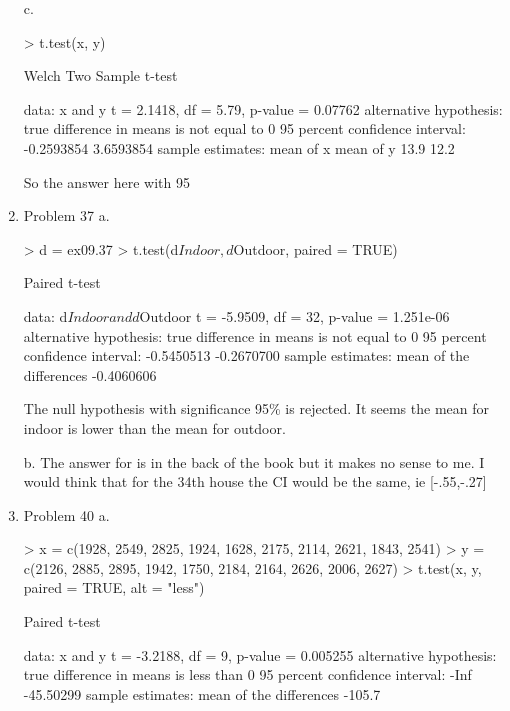 \documentclass[11pt,letterpaper]{article}
\begin{document}
\begin{enumerate}
c.
\begin{Schunk}
\begin{Sinput}
> t.test(x, y)
\end{Sinput}
\begin{Soutput}
	Welch Two Sample t-test

data:  x and y 
t = 2.1418, df = 5.79, p-value = 0.07762
alternative hypothesis: true difference in means is not equal to 0 
95 percent confidence interval:
 -0.2593854  3.6593854 
sample estimates:
mean of x mean of y 
     13.9      12.2 
\end{Soutput}
\end{Schunk}
So the answer here with 95 %

\item Problem 37
a.
\begin{Schunk}
\begin{Sinput}
> d = ex09.37
> t.test(d$Indoor, d$Outdoor, paired = TRUE)
\end{Sinput}
\begin{Soutput}
	Paired t-test

data:  d$Indoor and d$Outdoor 
t = -5.9509, df = 32, p-value = 1.251e-06
alternative hypothesis: true difference in means is not equal to 0 
95 percent confidence interval:
 -0.5450513 -0.2670700 
sample estimates:
mean of the differences 
             -0.4060606 
\end{Soutput}
\end{Schunk}

The null hypothesis with significance 95\% is rejected. It seems the mean for indoor is lower than the mean for outdoor.

b. The answer for is in the back of the book but it makes no sense to me. I would think that for the 34th house the CI would be the same, ie [-.55,-.27]

\item Problem 40
a.
\begin{Schunk}
\begin{Sinput}
> x = c(1928, 2549, 2825, 1924, 1628, 2175, 2114, 2621, 1843, 2541)
> y = c(2126, 2885, 2895, 1942, 1750, 2184, 2164, 2626, 2006, 2627)
> t.test(x, y, paired = TRUE, alt = "less")
\end{Sinput}
\begin{Soutput}
	Paired t-test

data:  x and y 
t = -3.2188, df = 9, p-value = 0.005255
alternative hypothesis: true difference in means is less than 0 
95 percent confidence interval:
      -Inf -45.50299 
sample estimates:
mean of the differences 
                 -105.7 
\end{Soutput}
\end{Schunk}


\end{enumerate}
\end{document}
